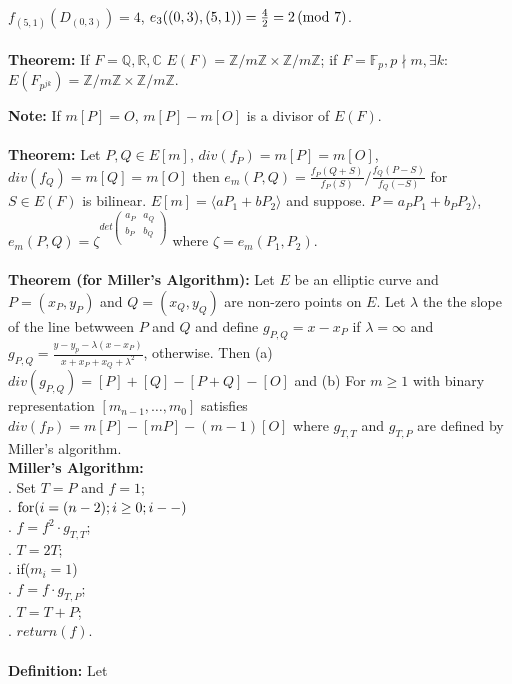 $f_{(5,1)}(D_{(0,3)})= 4$, $e_3((0,3),(5,1))= {\frac 4 2}= 2 \thinspace \textnormal{(mod } 7 \textnormal{)}$.
\\
\\
{\bf Theorem:} 
If $F= {\mathbb Q}, {\mathbb R}, {\mathbb C}$
$E(F)= {\mathbb Z}/m{\mathbb Z} \times {\mathbb Z}/m{\mathbb Z}$;
if $F= {\mathbb F_p}, p \nmid m, \exists k:$
$E(F_{p^{jk}})= {\mathbb Z}/m{\mathbb Z} \times {\mathbb Z}/m{\mathbb Z}$.
\begin{quote}
\end{quote}
{\bf Note:} 
If $m[P]=O$, $m[P]-m[O]$ is a divisor of $E(F)$.
\\
\\
{\bf Theorem:}  Let $P, Q \in E[m]$, 
$div(f_P)= m[P]=m[O]$,
$div(f_Q)= m[Q]=m[O]$ then $e_m(P,Q)= 
{\frac {f_P(Q+S)}{f_P(S)}}/
{\frac {f_Q(P-S)}{f_Q(-S)}}$ for $S \in E(F)$ is bilinear.
$E[m]= \langle aP_1+bP_2 \rangle$ and suppose.
$P= a_P P_1+b_P P_2 \rangle$, $e_m(P,Q)= \zeta^{det
\left(
\begin{array}{cc}
a_P &  a_Q \\
b_P &  b_Q \\
\end{array}
\right)
}$ where
$\zeta= e_m(P_1,P_2)$.
\\
\\
{\bf Theorem (for Miller's Algorithm):}  Let $E$ be an elliptic curve and
$P= (x_P, y_P)$ and
$Q= (x_Q, y_Q)$ are non-zero points on $E$.  Let $\lambda$ the the slope of
the line betwween $P$ and $Q$ and define 
$g_{P, Q}= x-x_P$ if $\lambda= \infty$ and
$g_{P, Q}= 
{\frac {y-y_p - \lambda(x-x_P)} {x+x_P+x_Q+\lambda^2}} $, otherwise.  Then (a)
$div(g_{P,Q})= [P]+[Q] -[P+Q]-[O]$ and
(b) For $m \ge 1$ with binary representation $[m_{n-1}, \ldots, m_0]$ satisfies
$div(f_P)= m[P]-[mP]-(m-1)[O]$ where 
$g_{T,T}$ and
$g_{T,P}$ are defined by Miller's algorithm.\\
{\bf Miller's Algorithm:}\\
. Set $T=P$ and $f=1$;\\
. $\textnormal{for}(i=(n-2); i \ge 0; i--)$\\
\jt {}. $f= f^2 \cdot g_{T,T}$;\\
\jt {}. $T= 2T$;\\
\jt {}. if($m_i=1$)\\
\jt \jt {}. $f= f \cdot g_{T,P}$;\\
\jt \jt {}. $T= T+P$;\\
. $return(f)$.
\\
\\
{\bf Definition:}  Let 
